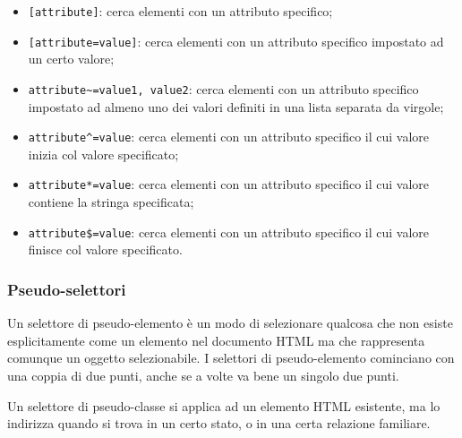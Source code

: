 \documentclass[a4paper,11pt]{article}
\begin{document}
\begin{itemize}
	\item \lstinline|[attribute]|: cerca elementi con un attributo specifico;
	\item \lstinline|[attribute=value]|: cerca elementi con un attributo specifico impostato ad un certo valore;
	\item \lstinline|attribute~=value1, value2|: cerca elementi con un attributo specifico impostato ad almeno uno dei valori definiti in una lista separata da virgole;
	\item \lstinline|attribute^=value|: cerca elementi con un attributo specifico il cui valore inizia col valore specificato;
	\item \lstinline|attribute*=value|: cerca elementi con un attributo specifico il cui valore contiene la stringa specificata;
	\item \lstinline|attribute$=value|: cerca elementi con un attributo specifico il cui valore finisce col valore specificato.
\end{itemize}

\subsubsection{Pseudo-selettori}
Un selettore di pseudo-elemento è un modo di selezionare qualcosa che non esiste esplicitamente come un elemento nel documento HTML ma che rappresenta comunque un oggetto selezionabile.
I selettori di pseudo-elemento cominciano con una coppia di due punti, anche se a volte va bene un singolo due punti. 

Un selettore di pseudo-classe si applica ad un elemento HTML esistente, ma lo indirizza quando si trova in un certo stato, o in una certa relazione familiare.
\end{document}
